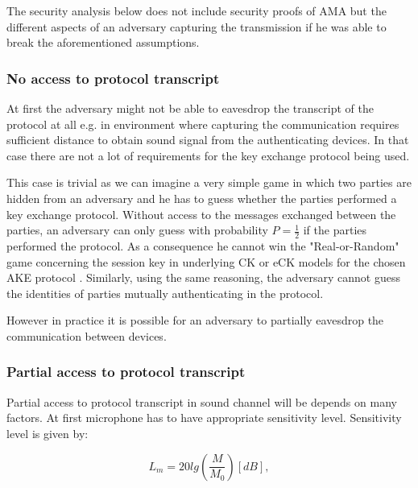 \documentclass[11pt,titlepage]{article}
\theoremstyle{plain}
\begin{document}
\vspace{5mm}

The security analysis below does not include security proofs of AMA but the different aspects of an adversary capturing the transmission if he was able to break the aforementioned assumptions.

\subsubsection{No access to protocol transcript}
At first the adversary might not be able to eavesdrop the transcript of the protocol at all e.g. in environment where capturing the communication requires sufficient distance to obtain sound signal from the authenticating devices. In that case there are not a lot of requirements for the key exchange protocol being used.

\vspace{5mm}

This case is trivial as we can imagine a very simple game in which two parties are hidden from an adversary and he has to guess whether the parties performed a key exchange protocol. Without access to the messages exchanged between the parties, an adversary can only guess with probability $P = \frac{1}{2}$ if the parties performed the protocol. As a consequence he cannot win the "Real-or-Random" game concerning the session key in underlying CK or eCK models for the chosen AKE protocol \cite{key_exchange, efficient_eck, security_canetti_krawczyk}. Similarly, using the same reasoning, the adversary cannot guess the identities of parties mutually authenticating in the protocol. 

\vspace{5mm}

However in practice it is possible for an adversary to partially eavesdrop the communication between devices.

\subsubsection{Partial access to protocol transcript}

Partial access to protocol transcript in sound channel will be depends on many factors. At first microphone has to have appropriate sensitivity level. Sensitivity level is given by:

\begin{equation}
	L_m = 20 lg\left(\frac{M}{M_0}\right)[dB],
\end{equation}
\end{document}
